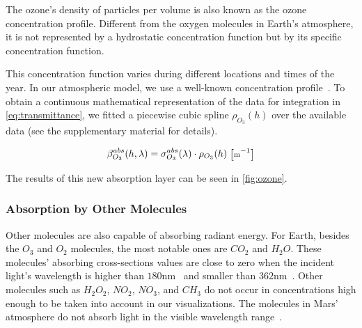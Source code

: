 \documentclass[journal]{vgtc}                %
\newcommand{\review}[1]{{\color{blue}#1}}
\begin{document}
The ozone's density of particles per volume is also known as the ozone concentration profile. Different from the oxygen molecules in Earth's atmosphere, it is not represented by a hydrostatic concentration function but by its specific concentration function. 

This concentration function varies during different locations and times of the year. In our atmospheric model, we use a well-known concentration profile~\cite{US_atmosphere:1976}. To obtain a continuous mathematical representation of the data for integration in \autoref{eq:transmittance}, we fitted a piecewise cubic spline $\rho_{O_3}(h)$ over the available data (see the \review{supplementary material} for details).

\vspace*{-2mm}
\begin{equation} \label{eq:beta-ozone}
  \small
  \beta^{abs}_{O_3}(h, \lambda) = \sigma^{abs}_{O_3}(\lambda) \cdot \rho_{O_3}(h)\ \big[\text{m}^{-1}\big]
\end{equation}

The results of this new absorption layer can be seen in \autoref{fig:ozone}.

\vspace*{-2mm}
\subsubsection{Absorption by Other Molecules}


\review{
Other molecules are also capable of absorbing radiant energy. For Earth, besides the $O_3$ and $O_2$ molecules, the most notable ones are $CO_2$ and $H_2O$. These molecules' absorbing cross-sections values are close to zero when the incident light's wavelength is higher than $180\text{nm}$~\cite{Shemansky:1972} and smaller than $362\text{nm}$~\cite{Lampel:2015}. Other molecules such as $H_2O_2$, $NO_2$, $NO_3$, and $CH_3$ do not occur in concentrations high enough to be taken into account in our visualizations. The molecules in Mars' atmosphere do not absorb light in the visible wavelength range~\cite{Haberle:2017}. 
}
\end{document}
